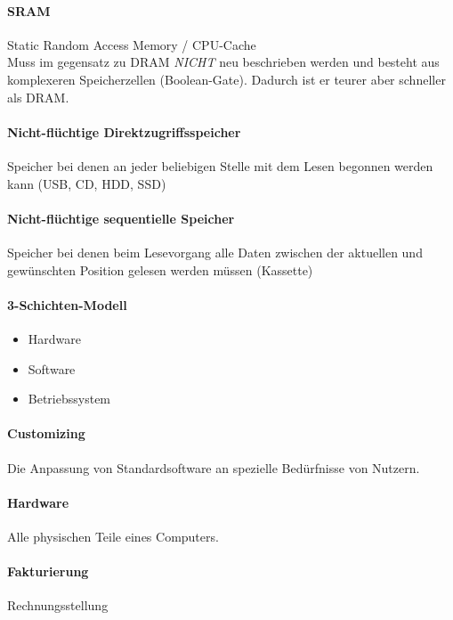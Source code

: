 \documentclass[twocolumn]{article}
\begin{document}
\paragraph{SRAM}
	Static Random Access Memory / CPU-Cache \\
	Muss im gegensatz zu DRAM \textit{NICHT} neu beschrieben werden und besteht aus komplexeren Speicherzellen (Boolean-Gate). Dadurch ist er teurer aber schneller als DRAM.

\paragraph{Nicht-flüchtige Direktzugriffsspeicher}
	Speicher bei denen an jeder beliebigen Stelle mit dem Lesen begonnen werden kann (USB, CD, HDD, SSD)

\paragraph{Nicht-flüchtige sequentielle Speicher}
	Speicher bei denen beim Lesevorgang alle Daten zwischen der aktuellen und gewünschten Position gelesen werden müssen (Kassette)

\paragraph{3-Schichten-Modell}
\begin{itemize}
	\item Hardware
	\item Software 
	\item Betriebssystem
\end{itemize}

\paragraph{Customizing}
	Die Anpassung von Standardsoftware an spezielle Bedürfnisse von Nutzern.

\paragraph{Hardware}
	Alle physischen Teile eines Computers. 

\paragraph{Fakturierung \\}
	Rechnungsstellung
\end{document}
